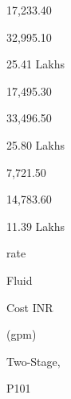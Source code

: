 \documentclass[a4paper,portrait,12pt]{article}
\begin{document}
17,233.40





32,995.10





\begin{flushleft}
25.41 Lakhs
\end{flushleft}





17,495.30





33,496.50





\begin{flushleft}
25.80 Lakhs
\end{flushleft}





7,721.50





14,783.60





\begin{flushleft}
11.39 Lakhs
\end{flushleft}





\begin{flushleft}
rate
\end{flushleft}


\begin{flushleft}
Fluid
\end{flushleft}





\begin{flushleft}
Cost INR
\end{flushleft}





\begin{flushleft}
(gpm)
\end{flushleft}


\begin{flushleft}
Two-Stage,
\end{flushleft}


\begin{flushleft}
P101
\end{flushleft}
\end{document}
